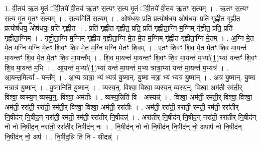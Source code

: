 \documentclass[17pt]{extarticle}
\begin{document}
1. वी॒तय॑ ऋ॒त मृ॒तं ॅवी॒तये॑ वी॒तय॑ ऋ॒तꣳ स॒त्यꣳ स॒त्य मृ॒तं ॅवी॒तये॑ वी॒तय॑ ऋ॒तꣳ स॒त्यम् । . ऋ॒तꣳ स॒त्यꣳ स॒त्य मृ॒त मृ॒तꣳ स॒त्यम् । . स॒त्यमिति॑ स॒त्यम् । . ओष॑धयः॒ प्रति॒ प्रत्योष॑धय॒ ओष॑धयः॒ प्रति॑ गृह्णीत गृह्णीत॒ प्रत्योष॑धय॒ ओष॑धयः॒ प्रति॑ गृह्णीत । . प्रति॑ गृह्णीत गृह्णीत॒ प्रति॒ प्रति॑ गृह्णीता॒ग्नि म॒ग्निम् गृ॑ह्णीत॒ प्रति॒ प्रति॑ गृह्णीता॒ग्निम् । . गृ॒ह्णी॒ता॒ग्नि म॒ग्निम् गृ॑ह्णीत गृह्णीता॒ग्नि मे॒त मे॒त म॒ग्निम् गृ॑ह्णीत गृह्णीता॒ग्नि मे॒तम् । . अ॒ग्नि मे॒त मे॒त म॒ग्नि म॒ग्नि मे॒तꣳ शि॒वꣳ शि॒व मे॒त म॒ग्नि म॒ग्नि मे॒तꣳ शि॒वम् । . ए॒तꣳ शि॒वꣳ शि॒व मे॒त मे॒तꣳ शि॒व मा॒यन्त॑ मा॒यन्तꣳ॑ शि॒व मे॒त मे॒तꣳ शि॒व मा॒यन्त᳚म् । . शि॒व मा॒यन्त॑ मा॒यन्तꣳ॑ शि॒वꣳ शि॒व मा॒यन्त॑ म॒भ्या᳚(1॒)भ्या॑ यन्तꣳ॑ शि॒वꣳ शि॒व मा॒यन्त॑ म॒भि । . आ॒यन्त॑ म॒भ्या᳚(1॒)भ्या॑ यन्त॑ मा॒यन्त॑ म॒भ्य त्रात्रा॒भ्या॑ यन्त॑ मा॒यन्त॑ म॒भ्यत्र॑ । . आ॒यन्त॒मित्या᳚ - यन्त᳚म् । . अ॒भ्य त्रात्रा॒ भ्य॑ भ्यत्र॑ यु॒ष्मान्. यु॒ष्मा नत्रा॒ भ्य॑ भ्यत्र॑ यु॒ष्मान् । . अत्र॑ यु॒ष्मान्. यु॒ष्मा नत्रात्र॑ यु॒ष्मान् । . यु॒ष्मानिति॑ यु॒ष्मान् । . व्यस्य॒न्॒. विश्वा॒ विश्वा॒ व्यस्य॒न् व्यस्य॒न्॒. विश्वा॒ अम॑ती॒ रम॑ती॒र् विश्वा॒ व्यस्य॒न् व्यस्य॒न्॒. विश्वा॒ अम॑तीः । . व्यस्य॒न्निति॑ वि - अस्यन्न्॑ । . विश्वा॒ अम॑ती॒ रम॑ती॒र् विश्वा॒ विश्वा॒ अम॑ती॒ ररा॑ती॒ ररा॑ती॒ रम॑ती॒र् विश्वा॒ विश्वा॒ अम॑ती॒ ररा॑तीः । . अम॑ती॒ ररा॑ती॒ ररा॑ती॒ रम॑ती॒ रम॑ती॒ ररा॑तीर् नि॒षीद॑न् नि॒षीद॒न् नरा॑ती॒ रम॑ती॒ रम॑ती॒ ररा॑तीर् नि॒षीदन्न्॑ । . अरा॑तीर् नि॒षीद॑न् नि॒षीद॒न् नरा॑ती॒ ररा॑तीर् नि॒षीद॑न् नो नो नि॒षीद॒न् नरा॑ती॒ ररा॑तीर् नि॒षीद॑न् नः । . नि॒षीद॑न् नो नो नि॒षीद॑न् नि॒षीद॑न् नो॒ अपाप॑ नो नि॒षीद॑न् नि॒षीद॑न् नो॒ अप॑ । . नि॒षीद॒न्नि ति॑ नि - सीदन्न्॑ । \newline
\end{document}
